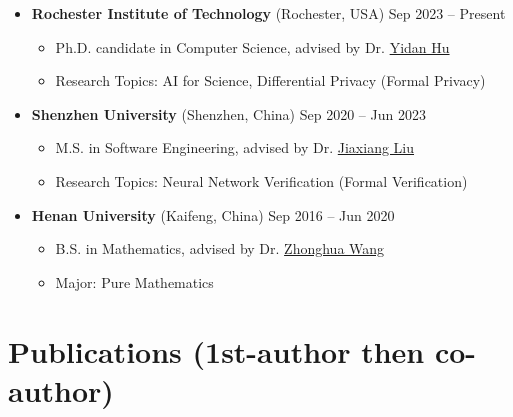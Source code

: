 \documentclass[a4paper,11pt]{article}
\begin{document}
\begin{itemize}[leftmargin=0pt,label={}]
    \item \textbf{Rochester Institute of Technology}{ \scriptsize (Rochester, USA)} \hfill Sep 2023 -- Present\vspace{-0.5em}    
    \begin{itemize}
      \item Ph.D. candidate in Computer Science, advised by Dr. \href{https://yidanhu.csec.rit.edu/}{Yidan Hu}
      \item Research Topics: AI for Science, Differential Privacy (Formal Privacy)
    \end{itemize}
    \item \textbf{Shenzhen University}{ \scriptsize (Shenzhen, China)} \hfill Sep 2020 -- Jun 2023\vspace{-0.5em}
    \begin{itemize}
      \item M.S. in Software Engineering, advised by Dr. \href{https://csse.szu.edu.cn/pages/user/index?id=1031}{Jiaxiang Liu}
      \item Research Topics: Neural Network Verification (Formal Verification)
    \end{itemize}
    \item \textbf{Henan University}{ \scriptsize (Kaifeng, China)} \hfill Sep 2016 -- Jun 2020\vspace{-0.5em}
    \begin{itemize}
      \item B.S. in Mathematics, advised by Dr. \href{https://maths.henu.edu.cn/info/1204/3593.htm}{Zhonghua Wang}
      \item Major: Pure Mathematics
    \end{itemize}
\end{itemize}


\section{\textbf{Publications} \textnormal{\scriptsize (1st-author then co-author)}}
\end{document}
